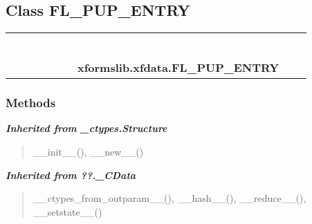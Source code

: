 
\subsection{Class FL\_PUP\_ENTRY}

    \label{xformslib:xfdata:FL_PUP_ENTRY}
\begin{tabular}{cccccccccc}
\multicolumn{2}{r}{\settowidth{\BCL}{object}\multirow{2}{\BCL}{object}}
&&
&&
&&
  \\\cline{3-3}
  &&\multicolumn{1}{c|}{}
&&
&&
&&
  \\
\multicolumn{4}{r}{\settowidth{\BCL}{??.\_CData}\multirow{2}{\BCL}{??.\_CData}}
&&
&&
  \\\cline{5-5}
  &&&&\multicolumn{1}{c|}{}
&&
&&
  \\
\multicolumn{6}{r}{\settowidth{\BCL}{\_ctypes.Structure}\multirow{2}{\BCL}{\_ctypes.Structure}}
&&
  \\\cline{7-7}
  &&&&&&\multicolumn{1}{c|}{}
&&
  \\
&&&&&&\multicolumn{2}{l}{\textbf{xformslib.xfdata.FL\_PUP\_ENTRY}}
\end{tabular}



  \subsubsection{Methods}


\large{\textbf{\textit{Inherited from \_ctypes.Structure}}}

\begin{quote}
\_\_init\_\_(), \_\_new\_\_()
\end{quote}

\large{\textbf{\textit{Inherited from ??.\_CData}}}

\begin{quote}
\_\_ctypes\_from\_outparam\_\_(), \_\_hash\_\_(), \_\_reduce\_\_(), \_\_setstate\_\_()
\end{quote}


